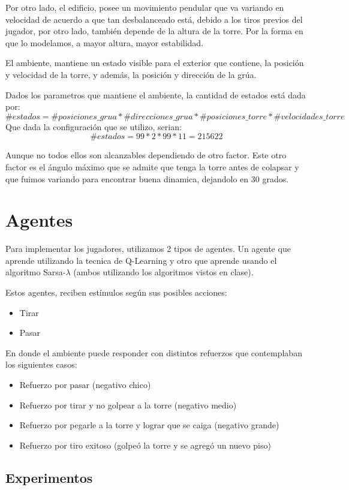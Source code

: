 \documentclass[11pt, a4paper]{article}
\newcommand{\slambda}{Sarsa-$\lambda$ }
\begin{document}
Por otro lado, el edificio, posee un movimiento pendular que va variando en velocidad de acuerdo a que tan desbalanceado est\'a, debido a los tiros previos del jugador, por otro lado, también depende de la altura de la torre. Por la forma en que lo modelamos, a mayor altura, mayor estabilidad.

El ambiente, mantiene un estado visible para el exterior que contiene, la posici\'on y velocidad de la torre, y adem\'as, la posici\'on y direcci\'on de la gr\'ua. 

Dados los parametros que mantiene el ambiente, la cantidad de estados est\'a dada por:
$$ \#estados = \#posiciones\_grua * \#direcciones\_grua * \#posiciones\_torre *  \#velocidades\_torre  $$
Que dada la configuraci\'on que se utilizo, serian:
$$ \# estados = 99 * 2 * 99 * 11 = 215622 $$

Aunque no todos ellos son alcanzables dependiendo de otro factor. Este otro factor es el \'angulo m\'aximo que se admite que tenga la torre antes de colapsar y que fuimos variando para encontrar buena dinamica, dejandolo en 30 grados. 

\section{Agentes}
Para implementar los jugadores, utilizamos 2 tipos de agentes. Un agente que aprende utilizando la tecnica de Q-Learning y otro que aprende usando el algoritmo \slambda (ambos utilizando los algoritmos vistos en clase).

Estos agentes, reciben est\'imulos seg\'un sus posibles acciones: 
\begin{itemize}
\item Tirar
\item Pasar
\end{itemize}
En donde el ambiente puede responder con distintos refuerzos que contemplaban los siguientes casos:
\begin{itemize}
\item Refuerzo por pasar (negativo chico)
\item Refuerzo por tirar y no golpear a la torre (negativo medio)
\item Refuerzo por pegarle a la torre y lograr que se caiga (negativo grande)
\item Refuerzo por tiro  exitoso (golpe\'o la torre y se agreg\'o un nuevo piso)
\end{itemize}

\newpage

\subsection{Experimentos}
\end{document}
